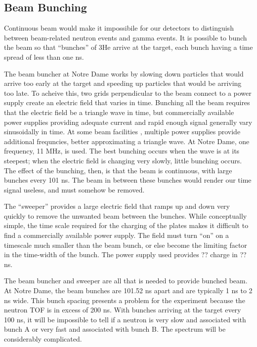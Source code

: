 \subsection{Beam Bunching}

Continuous beam would make it impossibile for our detectors to distinguish between beam-related neutron events and gamma events.  It is possible to bunch the beam so that ``bunches'' of 3He arrive at the target, each bunch having a time spread of less than one ns.  

The beam buncher at Notre Dame works by slowing down particles that would arrive too early at the target and speeding up particles that would be arriving too late.  To acheive this, two grids perpendicular to the beam connect to a power supply create an electric field that varies in time.  Bunching all the beam requires that the electric field be a triangle wave in time, but commercially available power supplies providing adequate current and rapid enough signal generally vary sinusoidally in time.  At some beam facilities \cite{LynchBunching}, multiple power supplies provide additional frequncies, better approximating a triangle wave.  At Notre Dame, one frequency, 11 MHz, is used.  The best bunching occurs when the wave is at its steepest; when the electric field is changing very slowly, little bunching occurs.  The effect of the bunching, then, is that the beam is continuous, with large bunches every 101 ns.  The beam in between these bunches would render our time signal useless, and must somehow be removed.

The ``sweeper'' provides a large electric field that ramps up and down very quickly to remove the unwanted beam between the bunches.  While conceptually simple, the time scale required for the charging of the plates makes it difficult to find a commercially available power supply.  The field must turn ``on'' on a timescale much smaller than the beam bunch, or else become the limiting factor in the time-width of the bunch.  The power supply used provides ?? charge in ?? ns.


The beam buncher and sweeper are all that is needed to provide bunched beam.  At Notre Dame, the beam bunches are 101.52 ns apart and are typically 1 ns to 2 ns wide.  This bunch spacing presents a problem for the experiment because the neutron TOF is in excess of 200 ns.  With bunches arriving at the target every 100 ns, it will be impossible to tell if a neutron is very slow and associated with bunch A or very fast and associated with bunch B.  The spectrum will be considerably complicated.

